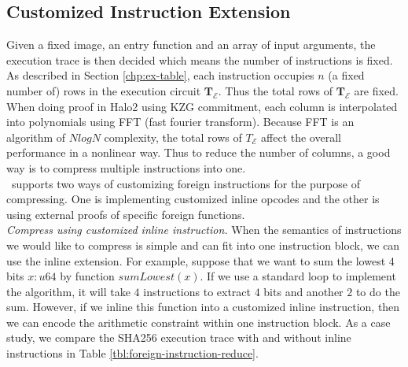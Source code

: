 \subsection{Customized Instruction Extension}
\label{chp:foreign}
Given a fixed image, an entry function and an array of input arguments, the execution trace is then decided which means the number of instructions is fixed. As described in Section \ref{chp:ex-table}, each instruction occupies $n$ (a fixed number of) rows in the execution circuit $\mathbf{T}_\mathcal{E}$. Thus the total rows of $\mathbf{T}_\mathcal{E}$ are fixed. When doing proof in Halo2 using KZG commitment, each column is interpolated into polynomials using FFT (fast fourier transform). Because FFT is an algorithm of $NlogN$ complexity, the total rows of $T_\mathcal{E}$ affect the overall performance in a nonlinear way. Thus to reduce the number of columns, a good way is to compress multiple instructions into one.\\

\zkwasm\, supports two ways of customizing foreign instructions for the purpose of compressing. One is implementing customized inline opcodes and the other is using external proofs of specific foreign functions.\\

\noindent\emph{Compress using customized inline instruction.} When the semantics of instructions we would like to compress is simple and can fit into one instruction block, we can use the inline extension. For example, suppose that we want to sum the lowest 4 bits $x:u64$ by function $sumLowest(x)$. If we use a standard loop to implement the algorithm, it will take $4$ instructions to extract $4$ bits and another $2$ to do the sum. However, if we inline this function into a customized inline instruction, then we can encode the arithmetic constraint within one instruction block. As a case study, we compare the SHA256 execution trace with and without inline instructions in Table \ref{tbl:foreign-instruction-reduce}.

